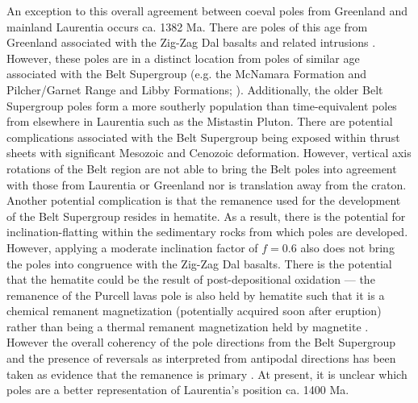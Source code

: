 \documentclass[twocolumn, switch]{article} %
\begin{document}
An exception to this overall agreement between coeval poles from Greenland and mainland Laurentia occurs ca. 1382 Ma. There are poles of this age from Greenland associated with the Zig-Zag Dal basalts and related intrusions \citep{Marcussen1983a, Abrahamsen1987a}. However, these poles are in a distinct location from poles of similar age associated with the Belt Supergroup (e.g. the McNamara Formation and Pilcher/Garnet Range and Libby Formations; \citealp{Elston2002a}). Additionally, the older Belt Supergroup poles form a more southerly population than time-equivalent poles from elsewhere in Laurentia such as the Mistastin Pluton. There are potential complications associated with the Belt Supergroup being exposed within thrust sheets with significant Mesozoic and Cenozoic deformation. However, vertical axis rotations of the Belt region are not able to bring the Belt poles into agreement with those from Laurentia or Greenland nor is translation away from the craton. Another potential complication is that the remanence used for the development of the Belt Supergroup resides in hematite. As a result, there is the potential for inclination-flatting within the sedimentary rocks from which poles are developed. However, applying a moderate inclination factor of $f=0.6$ also does not bring the poles into congruence with the Zig-Zag Dal basalts. There is the potential that the hematite could be the result of post-depositional oxidation --- the remanence of the Purcell lavas pole is also held by hematite such that it is a chemical remanent magnetization (potentially acquired soon after eruption) rather than being a thermal remanent magnetization held by magnetite \citep{Elston2002a}. However the overall coherency of the pole directions from the Belt Supergroup and the presence of reversals as interpreted from antipodal directions has been taken as evidence that the remanence is primary \citep{Elston2002a}. At present, it is unclear which poles are a better representation of Laurentia's position ca. 1400 Ma.
\end{document}

